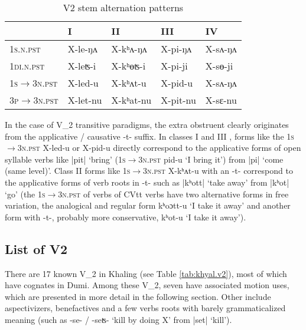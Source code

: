 \documentclass[oneside,a4paper,11pt]{article}
\newcommand{\ipa}[1]{{\phon#1}}
\newcommand{\dhatu}[2]{|\ipa{#1}| `#2'}
\begin{document}
\begin{table}[H] 
\caption{V2 stem alternation patterns} \label{tab:le.khAt.pi} \centering 
\begin{tabular}{lllll} 
\toprule 
&   I  &   II & III &  IV \\
\midrule
\textsc{1s.n.pst} &  \ipa{X-le-ŋʌ} & \ipa{X-kʰʌ-ŋʌ} &  \ipa{X-pi-ŋʌ}&  \ipa{X-sʌ-ŋʌ} \\
\textsc{1di.n.pst} &  \ipa{X-leʦ-i} & \ipa{X-kʰɵʦ-i} & \ipa{X-pi-ji} &  \ipa{X-sɵ-ji}   \\
\hline 
\textsc{1s$\rightarrow$3n.pst} &  \ipa{X-led-u} &  \ipa{X-kʰʌt-u} &   \ipa{X-pid-u} & \ipa{X-sʌ-ŋʌ} \\
\textsc{3p$\rightarrow$3n.pst} &    \ipa{X-let-nu} &    \ipa{X-kʰat-nu} & \ipa{X-pit-nu} & \ipa{X-sɛ-nu} \\
\bottomrule 
\end{tabular}
\end{table}

In the case of V_2 transitive paradigms, the extra obstruent clearly originates from the applicative / causative \ipa{-t-} suffix. In classes I and III , forms like the \textsc{1s$\rightarrow$3n.pst} \ipa{X-led-u}  or  \ipa{X-pid-u} directly correspond to the applicative forms of open syllable verbs like \dhatu{pit}{bring} (\textsc{1s$\rightarrow$3n.pst}  \ipa{pid-u} `I bring it') from \dhatu{pi}{come (same level)}. Class II forms like \textsc{1s$\rightarrow$3n.pst}  \ipa{X-kʰʌt-u} with an \ipa{-t-} correspond to the applicative forms of verb roots in \ipa{-t-} such as \dhatu{kʰott}{take away} from \dhatu{kʰot}{go} (the \textsc{1s$\rightarrow$3n.pst} of verbs of \ipa{CVtt} verbs have two alternative forms in free variation, the analogical and regular form \ipa{kʰoɔtt-u} `I take it away' and another form with \ipa{-t-}, probably more conservative, \ipa{kʰot-u} `I take it away').

\subsection{List of V2}
There are 17 known V_2 in Khaling (see Table \ref{tab:khyal.v2}), most of which have cognates in Dumi. Among these V_2, seven have associated motion uses, which are presented in more detail in the following section. Other include aspectivizers, benefactives and a few verbs roots with barely grammaticalized meaning (such as  \ipa{-se- / -seʦ-} `kill by doing X' from \dhatu{set}{kill}).
\end{document}
